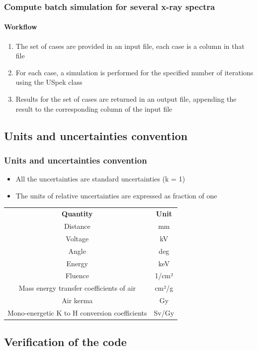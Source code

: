 \documentclass{beamer}
\newcommand{\highlight}[1]{{\color{blue} #1}}
\begin{document}
	\begin{frame}
		\frametitle{Compute batch simulation for several x-ray spectra}
		\framesubtitle{Workflow}
		\begin{enumerate}
			\setlength\itemsep{1em}
			\item The set of cases are provided in an \highlight{input file}, each case is a column in that file
			\item For each case, a \highlight{simulation} is performed for the specified number of iterations using the USpek class
			\item Results for the set of cases are returned in an \highlight{output file}, appending the result to the corresponding column of the input file
		\end{enumerate}
	\end{frame}
	
	\subsection{Units and uncertainties convention}
	
	\begin{frame}
		\frametitle{Units and uncertainties convention}
		\begin{itemize}
			\item All the uncertainties are standard uncertainties (k = 1)
			\item The units of relative uncertainties are expressed as fraction of one
		\end{itemize}
		\bigskip
		\centering
		\rowcolors{2}{gray!15}{white}
		\begin{tabular}{cc}
			\rowcolor{blue!25}
			\textbf{Quantity}&\textbf{Unit}\\
			Distance&mm\\
			Voltage&kV\\
			Angle&deg\\
			Energy&keV\\
			Fluence&1/cm²\\
			Mass energy transfer coefficients of air&cm²/g\\
			Air kerma&\textmu Gy\\
			Mono-energetic K to H conversion coefficients&Sv/Gy\\
		\end{tabular}
	\end{frame}
	
	\subsection{Verification of the code}
	
\end{document}
